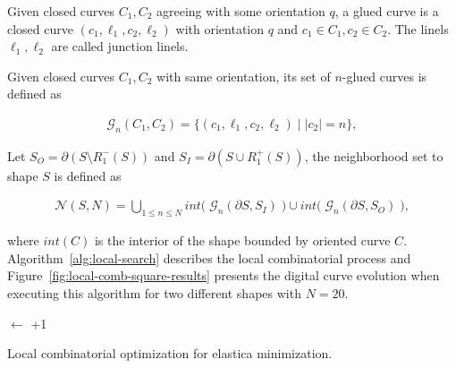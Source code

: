 \documentclass[runningheads]{llncs}
\begin{document}
\begin{definition}
Given closed curves $C_1,C_2$ agreeing with some orientation $q$, a glued curve is a closed curve  $(c_1,\ell_1,c_2,\ell_2)$ with orientation $q$ and $c_1 \in C_1, c_2 \in C_2$. The linels $\ell_1,\ell_2$ are called junction linels.
\end{definition}

\begin{definition}
Given closed curves $C_1,C_2$ with same orientation, its set of $n$-glued curves is defined as

\begin{align*}
	\mathcal{G}_n(C_1,C_2) = \{ (c_1,\ell_1,c_2,\ell_2) \; | \; |c_2|=n \},
\end{align*}
\end{definition}

Let $S_O = \partial ( S \setminus R_1^-(S) ) $ and $S_I = \partial ( S \cup R_1^+(S) )$, the neighborhood set to shape $S$ is defined as

\begin{align*}
	\mathcal{N}(S,N) = \bigcup_{1 \leq n \leq N} int \big( \; \mathcal{G}_{n}(\partial S, S_I) \;\big) \cup int \big( \; \mathcal{G}_{n}(\partial S, S_O) \; \big),
\end{align*}

where $int(C)$ is the interior of the shape bounded by oriented curve $C$. Algorithm~\ref{alg:local-search} describes the local combinatorial process and Figure~\ref{fig:local-comb-square-results} presents the digital curve evolution when executing this algorithm for two different shapes with $N=20$.


\begin{algorithm}
 
 \BlankLine
 \Delta $\longleftarrow$ \Tol+1\;
 \label{alg:local-search} 
 \caption{Local combinatorial optimization for elastica minimization.}
\end{algorithm}
\end{document}
